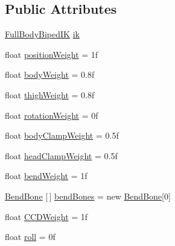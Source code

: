 \subsection*{Public Attributes}
\begin{DoxyCompactItemize}
\item 
\mbox{\hyperlink{class_root_motion_1_1_final_i_k_1_1_full_body_biped_i_k}{Full\+Body\+Biped\+IK}} \mbox{\hyperlink{class_root_motion_1_1_final_i_k_1_1_f_b_b_i_k_head_effector_a85cbd546d1b7b9eaedc86a0d82e3f8ef}{ik}}
\item 
float \mbox{\hyperlink{class_root_motion_1_1_final_i_k_1_1_f_b_b_i_k_head_effector_a68b93f5ee6cd358b08a3120fe3dde767}{position\+Weight}} = 1f
\item 
float \mbox{\hyperlink{class_root_motion_1_1_final_i_k_1_1_f_b_b_i_k_head_effector_a1657e586b7bad0454d5979f7c1eaa4e8}{body\+Weight}} = 0.\+8f
\item 
float \mbox{\hyperlink{class_root_motion_1_1_final_i_k_1_1_f_b_b_i_k_head_effector_abe631892a2fb5c20ac437afd5a5aa9da}{thigh\+Weight}} = 0.\+8f
\item 
float \mbox{\hyperlink{class_root_motion_1_1_final_i_k_1_1_f_b_b_i_k_head_effector_a8cdffd60f0f793a071ac7ee5c5433283}{rotation\+Weight}} = 0f
\item 
float \mbox{\hyperlink{class_root_motion_1_1_final_i_k_1_1_f_b_b_i_k_head_effector_abb88f38dbada6db2fc17e6cffef46751}{body\+Clamp\+Weight}} = 0.\+5f
\item 
float \mbox{\hyperlink{class_root_motion_1_1_final_i_k_1_1_f_b_b_i_k_head_effector_a5f4a4b1282149bf948dd213e6366bb62}{head\+Clamp\+Weight}} = 0.\+5f
\item 
float \mbox{\hyperlink{class_root_motion_1_1_final_i_k_1_1_f_b_b_i_k_head_effector_adee120ac8ec6eb2983c3eb83175fa85a}{bend\+Weight}} = 1f
\item 
\mbox{\hyperlink{class_root_motion_1_1_final_i_k_1_1_f_b_b_i_k_head_effector_1_1_bend_bone}{Bend\+Bone}} \mbox{[}$\,$\mbox{]} \mbox{\hyperlink{class_root_motion_1_1_final_i_k_1_1_f_b_b_i_k_head_effector_ae3d680491f318aaca66ea3f00ee28c8c}{bend\+Bones}} = new \mbox{\hyperlink{class_root_motion_1_1_final_i_k_1_1_f_b_b_i_k_head_effector_1_1_bend_bone}{Bend\+Bone}}\mbox{[}0\mbox{]}
\item 
float \mbox{\hyperlink{class_root_motion_1_1_final_i_k_1_1_f_b_b_i_k_head_effector_ae7745563964e42f5329f1e19274e5a9e}{C\+C\+D\+Weight}} = 1f
\item 
float \mbox{\hyperlink{class_root_motion_1_1_final_i_k_1_1_f_b_b_i_k_head_effector_aa4b978418e2642a671c5e4fb5db7d77a}{roll}} = 0f

\end{DoxyCompactItemize}
